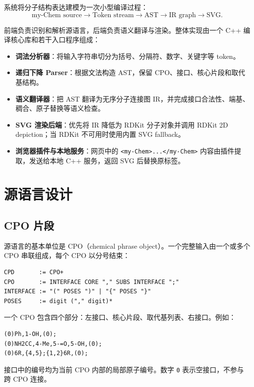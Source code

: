 \documentclass[UTF8,a4paper,11pt]{ctexart}
\begin{document}
系统将分子结构表达建模为一次小型编译过程：
\[
  \text{my-Chem source}
  \rightarrow \text{Token stream}
  \rightarrow \text{AST}
  \rightarrow \text{IR graph}
  \rightarrow \text{SVG}.
\]

前端负责识别和解析源语言，后端负责语义翻译与渲染。整体实现由一个 C++ 编译核心库和若干入口程序组成：
\begin{itemize}[leftmargin=2em]
  \item \textbf{词法分析器}：将输入字符串切分为括号、分隔符、数字、关键字等 token。
  \item \textbf{递归下降 Parser}：根据文法构造 AST，保留 CPO、接口、核心片段和取代基结构。
  \item \textbf{语义翻译器}：把 AST 翻译为无序分子连接图 IR，并完成接口合法性、端基、稠合、原子替换等语义检查。
  \item \textbf{SVG 渲染后端}：优先将 IR 降低为 RDKit 分子对象并调用 RDKit 2D depiction；当 RDKit 不可用时使用内置 SVG fallback。
  \item \textbf{浏览器插件与本地服务}：网页中的 \verb|<my-Chem>...</my-Chem>| 内容由插件提取，发送给本地 C++ 服务，返回 SVG 后替换原标签。
\end{itemize}

\section{源语言设计}

\subsection{CPO 片段}

源语言的基本单位是 CPO（chemical phrase object）。一个完整输入由一个或多个 CPO 串联组成，每个 CPO 以分号结束：

\begin{lstlisting}[language=mychem]
CPD       := CPO+
CPO       := INTERFACE CORE "," SUBS INTERFACE ";"
INTERFACE := "(" POSES ")" | "{" POSES "}"
POSES     := digit ("," digit)*
\end{lstlisting}

一个 CPO 包含四个部分：左接口、核心片段、取代基列表、右接口。例如：

\begin{lstlisting}[language=mychem]
(0)Ph,1-OH,(0);
(0)NH2CC,4-Me,5-=O,5-OH,(0);
(0)6R,{4,5};{1,2}6R,(0);
\end{lstlisting}

接口中的编号均为当前 CPO 内部的局部原子编号。数字 \verb|0| 表示空接口，不参与跨 CPO 连接。
\end{document}
